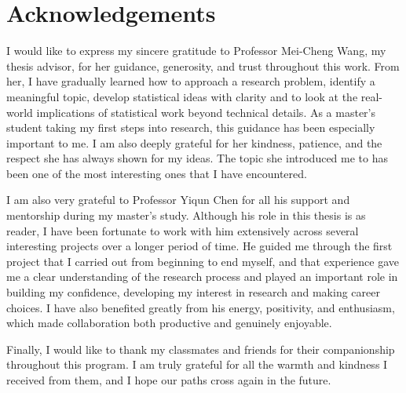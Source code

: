 \documentclass[12pt]{article}
\begin{document}
\vspace{5mm}



\newpage
\part*{Acknowledgements}

I would like to express my sincere gratitude to Professor Mei-Cheng Wang, my thesis advisor, for her guidance, generosity, and trust throughout this work. From her, I have gradually learned how to approach a research problem, identify a meaningful topic, develop statistical ideas with clarity and to look at the real-world implications of statistical work beyond technical details. As a master's student taking my first steps into research, this guidance has been especially important to me. I am also deeply grateful for her kindness, patience, and the respect she has always shown for my ideas. The topic she introduced me to has been one of the most interesting ones that I have encountered.

I am also very grateful to Professor Yiqun Chen for all his support and mentorship during my master's study. Although his role in this thesis is as reader, I have been fortunate to work with him extensively across several interesting projects over a longer period of time. He guided me through the first project that I carried out from beginning to end myself, and that experience gave me a clear understanding of the research process and played an important role in building my confidence, developing my interest in research and making career choices. I have also benefited greatly from his energy, positivity, and enthusiasm, which made collaboration both productive and genuinely enjoyable.

Finally, I would like to thank my classmates and friends for their companionship throughout this program. I am truly grateful for all the warmth and kindness I received from them, and I hope our paths cross again in the future.

\newpage
{}
\tableofcontents

\newpage
\listoftables
{}

\newpage
\listoffigures
{}
\end{document}
